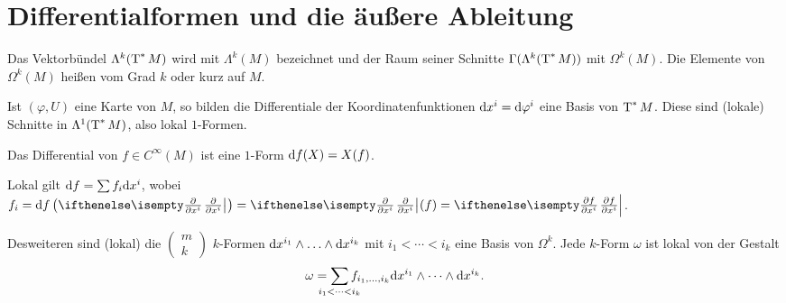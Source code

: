 \section{Differentialformen und die äußere Ableitung}

\begin{Dfn}
  Das Vektorbündel $\Lambda^k(\operatorname{T}^{*}M)$ wird mit $\Lambda^k(M)$ bezeichnet und der Raum seiner Schnitte $\Gamma(\Lambda^k(\operatorname{T}^{*}M))$ mit $\Omega^k(M)$. Die Elemente von $\Omega^k(M)$ heißen  vom Grad $k$ oder kurz  auf $M$.
\end{Dfn}

Ist $(\varphi, U)$ eine Karte von $M$, so bilden die Differentiale der Koordinatenfunktionen $\mathrm{d} x^i = \mathrm{d} \varphi^i$ eine Basis von $\operatorname{T}^{*}M$.
Diese sind (lokale) Schnitte in $\Lambda^1(\operatorname{T}^{*}M)$, also lokal $1$-Formen.

Das Differential von $f \in C^{\infty}(M)$ ist eine $1$-Form $\mathrm{d} f(X) = X(f)$.

Lokal gilt $\mathrm{d} f = \sum f_i \mathrm{d} x^i$, wobei $f_i = \dop f \left(\pdifffrac{}{x^i}\right) = \pdifffrac{}{x^i}(f) = \pdifffrac{f}{x^i}$.

Desweiteren sind (lokal) die $\left( \begin{smallmatrix} m \\ k\end{smallmatrix} \right)$ $k$-Formen $\mathrm{d} x^{i_1} \wedge \ldots \wedge \mathrm{d} x^{i_k}$ mit $i_1 < \cdots < i_k$ eine Basis von $\Omega^k$. Jede $k$-Form $\omega$ ist lokal von der Gestalt
\begin{align*}
  \omega = \sum_{\mathclap{i_1 < \cdots < i_k}}f_{i_1,\ldots,i_k}\dop x^{i_1} \wedge \cdots \wedge \dop x^{i_k}.
\end{align*}


